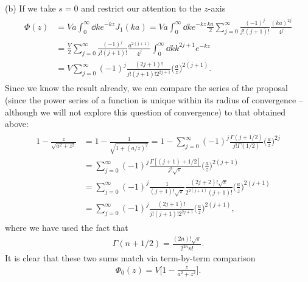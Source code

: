 {(b) If we take $s = 0$ and restrict our attention to the $z$-axis
\begin{eqnarray}
\begin{aligned}
    \Phi(z) &= Va \int_{0}^{\infty} \dd{k} e^{-kz} J_1(ka) = Va \int_{0}^{\infty} \dd{k} e^{-kz} \frac{ka}{2} \sum_{j=0}^{\infty} \frac{(-1)^{j}}{j! (j+1)!} \frac{(ka)^{2j}}{4^{j}} \\
            &= \frac{V}{2} \sum_{j=0}^{\infty} \frac{(-1)^{j}}{j!(j+1)!} \frac{a^{2(j+1)}}{4^{j}} \int_{0}^{\infty} \dd{k} k^{2j+1} e^{-kz} \\
            &= V \sum_{j=0}^{\infty} (-1)^{j}\frac{(2j+1)!}{j!(j+1)!2^{2j+1}} \Big( \frac{a}{z} \Big)^{2(j+1)}
.\end{aligned}
\end{eqnarray}
Since we know the result already, we can compare the series of the proposal (since the power series of a function is unique within its radius of convergence -- although we will not explore this question of convergence) to that obtained above:
\begin{eqnarray}
\begin{aligned}
    1 - \frac{z}{\sqrt{a^2 + z^2}} &= 1 - \frac{1}{\sqrt{1 + (a/z)^2}} = 1 - \sum_{j=0}^{\infty} (-1)^{j} \frac{\Gamma(j+1/2)}{j! \Gamma(1/2)} \Big( \frac{a}{z} \Big)^{2j} \\
    &= \sum_{j=0}^{\infty} (-1)^{j} \frac{\Gamma[(j+1)+1/2]}{j!\sqrt{\pi}} \Big( \frac{a}{z} \Big)^{2(j+1)} \\
    &= \sum_{j=0}^{\infty} (-1)^{j} \frac{1}{(j+1)!\sqrt{\pi}} \frac{(2j+2)!\sqrt{\pi}}{2^{2(j+1)}(j+1)!} \Big( \frac{a}{z} \Big)^{2(j+1)} \\
    &= \sum_{j=0}^{\infty} (-1)^{j} \frac{(2j+1)!}{j!(j+1)! 2^{2j+1}} \Big( \frac{a}{z} \Big)^{2(j+1)}
,\end{aligned}
\end{eqnarray}
where we have used the fact that 
\begin{eqnarray}
    \Gamma(n+1/2) = \frac{(2n)!\sqrt{\pi}}{2^{2n}n!}
.\end{eqnarray}
It is clear that these two sums match via term-by-term comparison%
\begin{eqnarray}
    \Phi_0(z) = V \Big[ 1 - \frac{z}{a^2 + z^2} \Big]
.\end{eqnarray}

}
